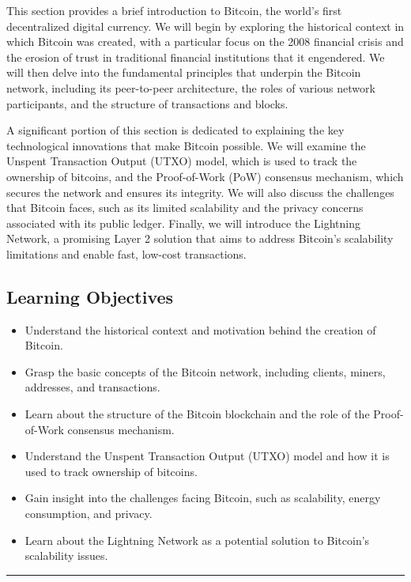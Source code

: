 This section provides a brief introduction to Bitcoin, the
world's first decentralized digital currency. We will begin by exploring
the historical context in which Bitcoin was created, with a particular
focus on the 2008 financial crisis and the erosion of trust in
traditional financial institutions that it engendered. We will then
delve into the fundamental principles that underpin the Bitcoin network,
including its peer-to-peer architecture, the roles of various network
participants, and the structure of transactions and blocks.

A significant portion of this section is dedicated to explaining the key
technological innovations that make Bitcoin possible. We will examine
the Unspent Transaction Output (UTXO) model, which is used to track the
ownership of bitcoins, and the Proof-of-Work (PoW) consensus mechanism,
which secures the network and ensures its integrity. We will also
discuss the challenges that Bitcoin faces, such as its limited
scalability and the privacy concerns associated with its public ledger.
Finally, we will introduce the Lightning Network, a promising Layer 2
solution that aims to address Bitcoin's scalability limitations and
enable fast, low-cost transactions.

\subsection{Learning Objectives}\label{learning-objectives}

\begin{itemize}
	\tightlist
	\item
	Understand the historical context and motivation behind the creation
	of Bitcoin.
	\item
	Grasp the basic concepts of the Bitcoin network, including clients,
	miners, addresses, and transactions.
	\item
	Learn about the structure of the Bitcoin blockchain and the role of
	the Proof-of-Work consensus mechanism.
	\item
	Understand the Unspent Transaction Output (UTXO) model and how it is
	used to track ownership of bitcoins.
	\item
	Gain insight into the challenges facing Bitcoin, such as scalability,
	energy consumption, and privacy.
	\item
	Learn about the Lightning Network as a potential solution to Bitcoin's
	scalability issues.
\end{itemize}

\begin{center}\rule{0.5\linewidth}{0.5pt}\end{center}

